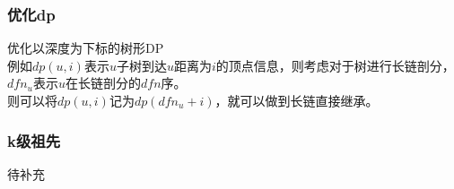 \subsubsection{优化dp}
\noindent 优化以深度为下标的树形DP\\
例如$dp(u,i)$表示$u$子树到达$u$距离为$i$的顶点信息，则考虑对于树进行长链剖分，$dfn_u$表示$u$在长链剖分的$dfn$序。\\
则可以将$dp(u,i)$记为$dp(dfn_u+i)$，就可以做到长链直接继承。
\subsubsection{k级祖先}
待补充

